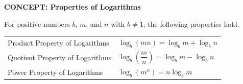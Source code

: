 \documentclass[border=6pt]{standalone}
\begin{document}
\begin{minipage}{10cm}
\centering
\textbf{CONCEPT: Properties of Logarithms}\par\vspace{2pt}
\small For positive numbers $b$, $m$, and $n$ with $b\ne 1$, the following properties hold.\par\vspace{8pt}
\normalsize
\begin{tabular}{@{} >{\raggedright\arraybackslash}p{4.7cm} >{\centering\arraybackslash}p{4.3cm} @{}}
\toprule
Product Property of Logarithms & $\log_b(mn)=\log_b m+\log_b n$ \\[6pt]
Quotient Property of Logarithms & $\log_b\left(\dfrac{m}{n}\right)=\log_b m-\log_b n$ \\[6pt]
Power Property of Logarithms & $\log_b(m^{n})=n\log_b m$ \\
\bottomrule
\end{tabular}
\end{minipage}
\end{document}
